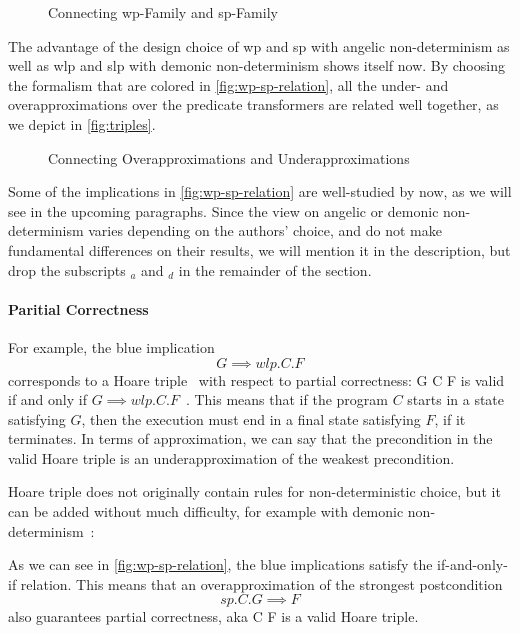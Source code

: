 \begin{figure}[h]
	\centering
	
	\caption{Connecting wp-Family and sp-Family}
	\label{fig:wp-sp-relation}
\end{figure}

The advantage of the design choice of wp and sp with angelic non-determinism as well as wlp and slp with demonic non-determinism shows itself now. 
By choosing the formalism that are colored in \autoref{fig:wp-sp-relation}, all the under- and overapproximations over the predicate transformers are related well together, as we depict in \autoref{fig:triples}.
\begin{figure}[h]
	\centering
	
	\caption{Connecting Overapproximations and Underapproximations}
	\label{fig:triples}
\end{figure}

Some of the implications in \autoref{fig:wp-sp-relation} are well-studied by now, as we will see in the upcoming paragraphs. 
Since the view on angelic or demonic non-determinism varies depending on the authors' choice, and do not make fundamental differences on their results, we will mention it in the description, but drop the subscripts $_a$ and $_d$ in the remainder of the section. 

\paragraph{Paritial Correctness}
For example, the blue implication $$G\implies wlp.C.F$$ corresponds to a Hoare triple~\cite{hoare69} with respect to partial correctness: \hoare G C F is valid if and only if $G\implies wlp.C.F$~\cite{gordon2010ForwardHoare,nipkow2002isabelle}. 
This means that if the program $C$ starts in a state satisfying $G$, then the execution must end in a final state satisfying $F$, if it terminates. 
In terms of approximation, we can say that the precondition in the valid Hoare triple is an underapproximation of the weakest precondition. 

Hoare triple does not originally contain rules for non-deterministic choice, but it can be added without much difficulty, for example with demonic non-determinism~\cite{nipkow2002HoareLogicsIsabelle}: 
\begin{center}
	\begin{prooftree}
	\end{prooftree}
\end{center}
As we can see in \autoref{fig:wp-sp-relation}, the blue implications satisfy the if-and-only-if relation. 
This means that an overapproximation of the strongest postcondition $$sp.C.G\implies F$$ also guarantees partial correctness, aka C F is a valid Hoare triple. 

